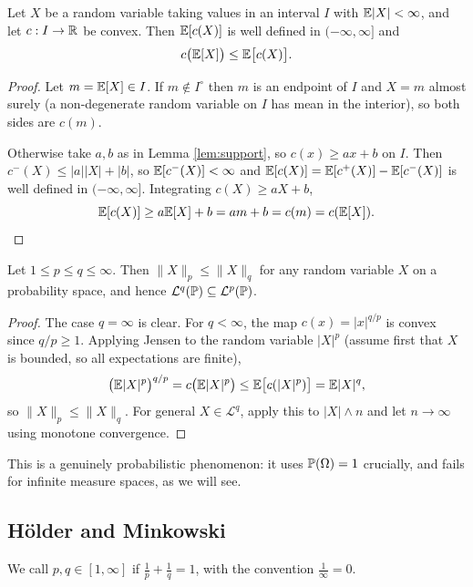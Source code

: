 \documentclass[a4paper]{scrartcl}
\newcommand{\cL}{\mathcal{L}}
\begin{document}
\begin{theorem}\label{thm:jensen}
	Let $X$ be a random variable taking values in an interval $I$ with $\mathbb{E}|X| < \infty$, and let $c : I \to \mathbb{R}$ be convex. Then $\mathbb{E}[c(X)]$ is well defined in $(-\infty,\infty]$ and
	$$
	c\big(\mathbb{E}[X]\big) \leq \mathbb{E}\big[c(X)\big].
	$$
\end{theorem}
\begin{proof}
	Let $m = \mathbb{E}[X] \in I$. If $m \notin I^\circ$ then $m$ is an endpoint of $I$ and $X = m$ almost surely (a non-degenerate random variable on $I$ has mean in the interior), so both sides are $c(m)$.

	Otherwise take $a,b$ as in Lemma \ref{lem:support}, so $c(x) \geq ax + b$ on $I$. Then $c^-(X) \leq |a||X| + |b|$, so $\mathbb{E}[c^-(X)] < \infty$ and $\mathbb{E}[c(X)] = \mathbb{E}[c^+(X)]-\mathbb{E}[c^-(X)]$ is well defined in $(-\infty,\infty]$. Integrating $c(X)\geq aX+b$,
	$$
	\mathbb{E}[c(X)] \geq a\mathbb{E}[X]+b = am+b = c(m) = c(\mathbb{E}[X]). \qedhere
	$$
\end{proof}

\begin{corollary}\label{cor:lp-nested}
	Let $1 \leq p \leq q \leq \infty$. Then $\|X\|_p \leq \|X\|_q$ for any random variable $X$ on a probability space, and hence $\cL^q(\PP)\subseteq\cL^p(\PP)$.
\end{corollary}
\begin{proof}
	The case $q = \infty$ is clear. For $q<\infty$, the map $c(x) = |x|^{q/p}$ is convex since $q/p \geq 1$. Applying Jensen to the random variable $|X|^p$ (assume first that $X$ is bounded, so all expectations are finite),
	$$
	\big(\mathbb{E}|X|^p\big)^{q/p} = c\big(\mathbb{E}|X|^p\big) \leq \mathbb{E}\big[c(|X|^p)\big] = \mathbb{E}|X|^q,
	$$
	so $\|X\|_p \leq \|X\|_q$. For general $X \in \cL^q$, apply this to $|X|\wedge n$ and let $n \to\infty$ using monotone convergence.
\end{proof}

This is a genuinely probabilistic phenomenon: it uses $\mathbb{P}(\Omega)=1$ crucially, and fails for infinite measure spaces, as we will see.

\subsection{H\"older and Minkowski}

\begin{definition}
	We call $p,q \in[1,\infty]$  if $\frac1p+\frac1q=1$, with the convention $\frac1\infty = 0$.
\end{definition}
\end{document}
